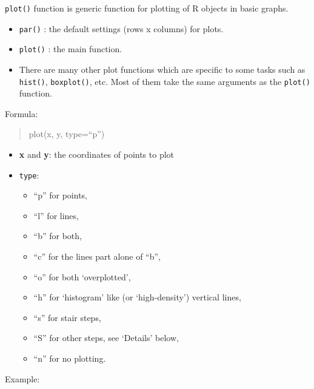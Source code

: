 \documentclass[]{book}
\begin{document}
\texttt{plot()} function is generic function for plotting of R objects
in basic graphs.

\begin{itemize}
\item
  \texttt{par()} : the default settings (rows x columns) for plots.
\item
  \texttt{plot()} : the main function.
\item
  There are many other plot functions which are specific to some tasks
  such as \texttt{hist()}, \texttt{boxplot()}, etc. Most of them take
  the same arguments as the \texttt{plot()} function.
\end{itemize}

Formula:

\begin{quote}
plot(x, y, type=``p'')
\end{quote}

\begin{itemize}
\item
  \textbf{x} and \textbf{y}: the coordinates of points to plot
\item
  \texttt{type}:

  \begin{itemize}
  \item
    ``p'' for points,
  \item
    ``l'' for lines,
  \item
    ``b'' for both,
  \item
    ``c'' for the lines part alone of ``b'',
  \item
    ``o'' for both `overplotted',
  \item
    ``h'' for `histogram' like (or `high-density') vertical lines,
  \item
    ``s'' for stair steps,
  \item
    ``S'' for other steps, see `Details' below,
  \item
    ``n'' for no plotting.
  \end{itemize}
\end{itemize}

Example:
\end{document}
